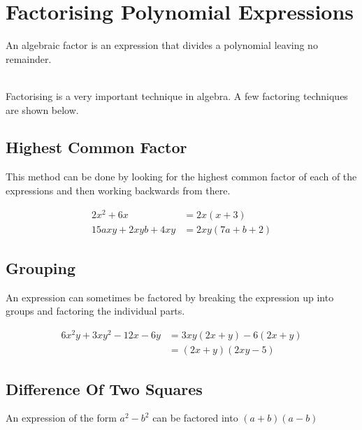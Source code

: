 \documentclass[english,seminar]{lecture}
\begin{document}
\section{Factorising Polynomial Expressions}\label{factoring}


\begin{definition}[Factor]
	An algebraic factor is an expression that divides a polynomial leaving no remainder.
\end{definition}
\\

Factorising is a very important technique in algebra.
A few factoring techniques are shown below.

\subsection{Highest Common Factor}

This method can be done by looking for the highest common factor of each of the expressions and then working backwards from there.

\begin{example}[Factor]
	\begin{align*}
		2x^2 + 6x &= 2x(x + 3)\\
		15axy + 2xyb + 4xy &= 2xy(7a + b + 2)
	\end{align*}
\end{example}

\subsection{Grouping}

An expression can sometimes be factored by breaking the expression up into groups and factoring the individual parts.

\begin{example}[Factor]
	\begin{align*}
		6x^2y + 3xy^2 -12x - 6y &= 3xy(2x + y) - 6(2x + y)\\
		&= (2x + y)(2xy - 5)
	\end{align*}
\end{example}

\subsection{Difference Of Two Squares}

\begin{theorem}
	An expression of the form $a^2 - b^2$ can be factored into $(a + b)(a - b)$
\end{theorem}
\end{document}

